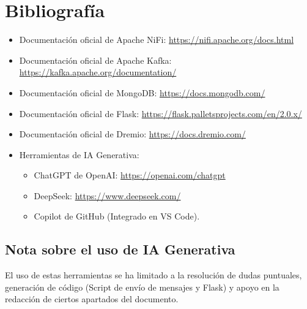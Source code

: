 \documentclass{../../../miPlantilla}
\begin{document}
\section{Bibliografía}
\begin{itemize}
  \item Documentación oficial de Apache NiFi: \url{https://nifi.apache.org/docs.html}
  \item Documentación oficial de Apache Kafka: \url{https://kafka.apache.org/documentation/}
  \item Documentación oficial de MongoDB: \url{https://docs.mongodb.com/}
  \item Documentación oficial de Flask: \url{https://flask.palletsprojects.com/en/2.0.x/}
  \item Documentación oficial de Dremio: \url{https://docs.dremio.com/}
  \item Herramientas de IA Generativa:
  \begin{itemize}
    \item ChatGPT de OpenAI: \url{https://openai.com/chatgpt}
    \item DeepSeek: \url{https://www.deepseek.com/}
    \item Copilot de GitHub (Integrado en VS Code).
  \end{itemize}
\end{itemize}

\subsection*{Nota sobre el uso de IA Generativa}
El uso de estas herramientas se ha limitado a la resolución de dudas puntuales, generación de código (Script de envío de mensajes y Flask) y
apoyo en la redacción de ciertos apartados del documento.
\end{document}
